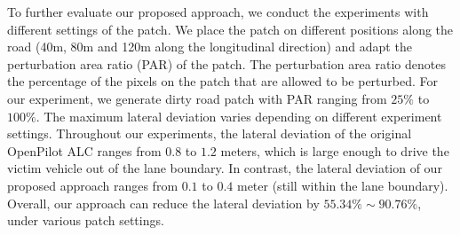 To further evaluate our proposed approach, we conduct the experiments with different settings of the patch. We place the patch on different positions along the road (40m, 80m and 120m along the longitudinal direction) and adapt the perturbation area ratio (PAR) of the patch. The perturbation area ratio denotes the percentage of the pixels on the patch that are allowed to be perturbed. For our experiment, we generate dirty road patch with PAR ranging from $25\%$ to $100\%$. The maximum lateral deviation varies depending on different experiment settings. Throughout our experiments, the lateral deviation of the original OpenPilot ALC ranges from $0.8$ to $1.2$ meters, which is large enough to drive the victim vehicle out of the lane boundary. In contrast, the lateral deviation of our proposed approach ranges from $0.1$ to $0.4$ meter (still within the lane boundary). Overall, our approach can reduce the lateral deviation by $55.34\%\sim 90.76\%$, under various patch settings.

